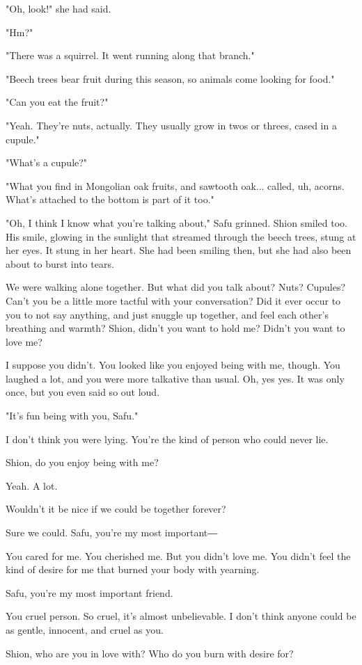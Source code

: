 "Oh, look!" she had said.

"Hm?"

"There was a squirrel. It went running along that branch."

"Beech trees bear fruit during this season, so animals come looking for
food."

"Can you eat the fruit?"

"Yeah. They're nuts, actually. They usually grow in twos or threes,
cased in a cupule."

"What's a cupule?"

"What you find in Mongolian oak fruits, and sawtooth oak... called, uh,
acorns. What's attached to the bottom is part of it too."

"Oh, I think I know what you're talking about," Safu grinned. Shion
smiled too. His smile, glowing in the sunlight that streamed through the
beech trees, stung at her eyes. It stung in her heart. She had been
smiling then, but she had also been about to burst into tears.

We were walking alone together. But what did you talk about? Nuts?
Cupules? Can't you be a little more tactful with your conversation? Did
it ever occur to you to not say anything, and just snuggle up together,
and feel each other's breathing and warmth? Shion, didn't you want to
hold me? Didn't you want to love me?

I suppose you didn't. You looked like you enjoyed being with me, though.
You laughed a lot, and you were more talkative than usual. Oh, yes yes.
It was only once, but you even said so out loud.

"It's fun being with you, Safu."

I don't think you were lying. You're the kind of person who could never
lie.

Shion, do you enjoy being with me?

Yeah. A lot.

Wouldn't it be nice if we could be together forever?

Sure we could. Safu, you're my most important―

You cared for me. You cherished me. But you didn't love me. You didn't
feel the kind of desire for me that burned your body with yearning.

Safu, you're my most important friend.

You cruel person. So cruel, it's almost unbelievable. I don't think
anyone could be as gentle, innocent, and cruel as you.

Shion, who are you in love with? Who do you burn with desire for?

